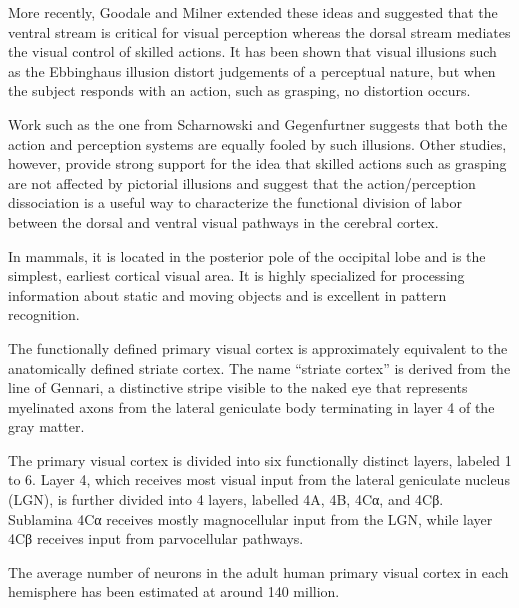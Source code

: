 More recently, Goodale and Milner extended these ideas and suggested that the ventral stream is critical for visual perception whereas the dorsal stream mediates the visual control of skilled actions. It has been shown that visual illusions such as the Ebbinghaus illusion distort judgements of a perceptual nature, but when the subject responds with an action, such as grasping, no distortion occurs.

Work such as the one from Scharnowski and Gegenfurtner suggests that both the action and perception systems are equally fooled by such illusions. Other studies, however, provide strong support for the idea that skilled actions such as grasping are not affected by pictorial illusions and suggest that the action/perception dissociation is a useful way to characterize the functional division of labor between the dorsal and ventral visual pathways in the cerebral cortex.

In mammals, it is located in the posterior pole of the occipital lobe and is the simplest, earliest cortical visual area. It is highly specialized for processing information about static and moving objects and is excellent in pattern recognition.

The functionally defined primary visual cortex is approximately equivalent to the anatomically defined striate cortex. The name ``striate cortex'' is derived from the line of Gennari, a distinctive stripe visible to the naked eye that represents myelinated axons from the lateral geniculate body terminating in layer 4 of the gray matter.

The primary visual cortex is divided into six functionally distinct layers, labeled 1 to 6. Layer 4, which receives most visual input from the lateral geniculate nucleus (LGN), is further divided into 4 layers, labelled 4A, 4B, 4Cα, and 4Cβ. Sublamina 4Cα receives mostly magnocellular input from the LGN, while layer 4Cβ receives input from parvocellular pathways.

The average number of neurons in the adult human primary visual cortex in each hemisphere has been estimated at around 140 million.

